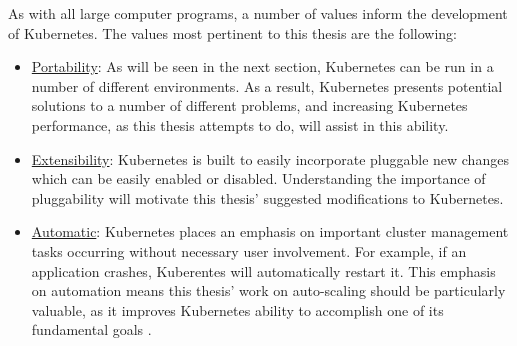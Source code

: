 As with all large computer programs, a number of values inform the development of
Kubernetes. The values most pertinent to this thesis are the following:

\begin{itemize}
  \item \underline{Portability}: As will be seen in the next section,
    Kubernetes can be run in a number of different environments. As a result,
    Kubernetes presents potential solutions to a number of different problems, and
    increasing Kubernetes performance, as this thesis attempts to do, will assist in
    this ability.
  \item \underline{Extensibility}: Kubernetes is built to
    easily incorporate pluggable new changes which can be easily enabled or
    disabled. Understanding the importance of pluggability will motivate this
    thesis' suggested modifications to Kubernetes.
  \item \underline{Automatic}: Kubernetes places an emphasis on important
    cluster management tasks occurring without necessary user involvement. For
    example, if an application crashes, Kuberentes will automatically restart
    it. This emphasis on automation means this thesis' work on auto-scaling
    should be particularly valuable, as it improves Kubernetes ability to
    accomplish one of its fundamental goals \cite{what-is-k8s}.
\end{itemize}
